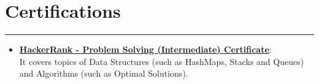 \documentclass[a4paper,10pt]{article}
\begin{document}
\section*{Certifications}
\vspace{-.2em}
\hrule
\vspace{0.5em}
\begin{itemize}
    \item \textbf{\href{https://www.hackerrank.com/certificates/0546eb7d14c4}{HackerRank - Problem Solving (Intermediate) Certificate}}:\\ It covers topics of Data Structures (such as HashMaps, Stacks and Queues) and Algorithms (such as Optimal Solutions).
\end{itemize}
\end{document}
